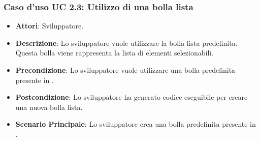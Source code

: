 \subsubsection{Caso d'uso UC 2.3: Utilizzo di una bolla lista}

\FloatBarrier
\begin{itemize}
\item\textbf{Attori}: Sviluppatore.
\item\textbf{Descrizione}: Lo sviluppatore vuole utilizzare la bolla lista predefinita. Questa bolla viene rappresenta la lista di elementi selezionabili.
\item\textbf{Precondizione}: Lo sviluppatore vuole utilizzare una bolla predefinita presente in \progetto.
\item\textbf{Postcondizione}: Lo sviluppatore ha generato codice eseguibile per creare una nuova bolla lista.
\item\textbf{Scenario Principale}: Lo sviluppatore crea una bolla predefinita presente in \progetto.
\end{itemize}